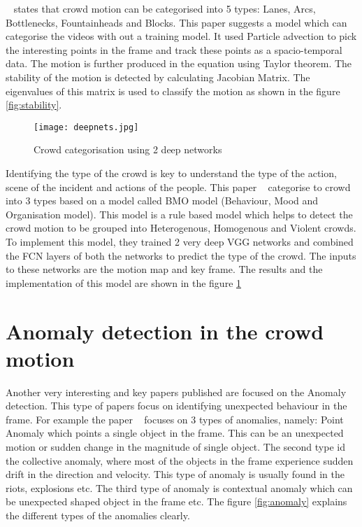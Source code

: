 ~\cite{solmaz2012identifying} states that crowd motion can be categorised into 5 types: Lanes, Arcs, 
Bottlenecks, Fountainheads and Blocks. This paper suggests a model which can categorise the videos 
with out a training model. It used Particle advection to pick the interesting points in the frame and track 
these points as a spacio-temporal data. The motion is further produced in the equation using Taylor 
theorem. The stability of the motion is detected by calculating Jacobian Matrix. The eigenvalues of this 
matrix is used to classify the motion as shown in the figure \ref{fig:stability}.

\begin{figure}[tb]
	\center\texttt{[image: deepnets.jpg]}
	\caption{Crowd categorisation using 2 deep networks}
	\label{fig:2deep}
\end{figure}

Identifying the type of the crowd is key to understand the type of the action, scene of the incident and 
actions of the people. This paper ~\cite{wei2020very} categorise to crowd into 3 types based on a 
model called BMO model (Behaviour, Mood and Organisation model). This model is a rule based model 
which helps to detect the crowd motion to be grouped into Heterogenous, Homogenous and Violent 
crowds. To implement this model, they trained 2 very deep VGG networks and combined the FCN 
layers of both the networks to predict the type of the crowd. The inputs to these networks are the motion 
map and key frame. The results and the implementation of this model are shown in the figure 
\ref{fig:2deep}

\section{Anomaly detection in the crowd motion}
Another very interesting and key papers published are focused on the Anomaly detection. This type of papers focus on identifying unexpected behaviour in the frame. For example the paper ~\cite{bansod2020crowd} focuses on 3 types of anomalies, namely: Point Anomaly which points a single object in the frame. This can be an unexpected motion or sudden change in the magnitude of single object. The second type id the collective anomaly, where most of the objects in the frame experience sudden drift in the direction and velocity. This type of anomaly is usually found in the riots, explosions etc. The third type of anomaly is contextual anomaly which can be unexpected shaped object in the frame etc. The figure \ref{fig:anomaly} explains the different types of the anomalies clearly.

